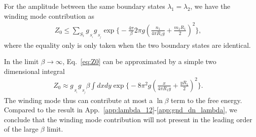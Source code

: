 For the amplitude between the same boundary states $\lambda_1=\lambda_2$, we have the winding mode contribution as
\begin{equation}
\begin{aligned}
\label{eq:Z0}
Z_0 \le  \sum_{S_i} g_{\,\!_{S_i} }g_{\,\!_{S_j} } \exp\Big\{- \frac{4\pi}{\beta} 2 \pi g ( \frac{n_1}{ 4 \pi R_1 g} + \frac{m_1 R_1 }{ 2} )^2 \Big\},
\end{aligned}
\end{equation}
where the equality only is only taken when the two boundary states are identical. 

In the limit $\beta\rightarrow\infty$, Eq.~\eqref{eq:Z0} can be approximated by a simple two dimensional integral
\begin{equation}\begin{aligned}
Z_0\approx g_{\,\!_{S_i} }g_{\,\!_{S_j} }\beta\int dxdy\exp\Big\{-8 \pi^2 g ( \frac{x}{ 4 \pi R_1 g} + \frac{y R_1 }{ 2} )^2 \Big\}.
\end{aligned}\end{equation}
The winding mode thus can contribute at most a $\ln\beta$ term to the free energy. Compared to the result in App.~\ref{app:lambda_12}-\ref{app:gnd_dn_lambda}, we conclude that the winding mode contribution will not present in the leading order of the large $\beta$ limit. 


